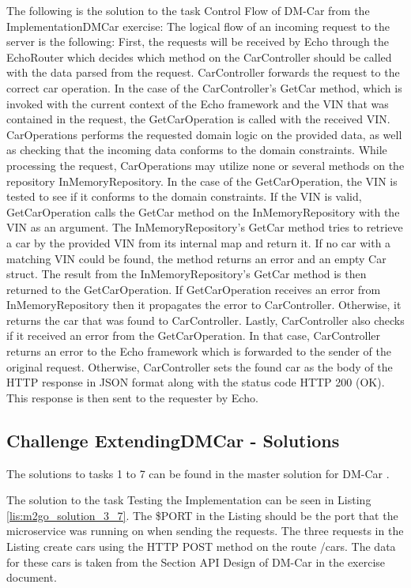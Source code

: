 The following is the solution to the task Control Flow of DM-Car from the ImplementationDMCar exercise:
The logical flow of an incoming request to the server is the following: First, the requests
will be received by Echo through the EchoRouter which decides which method on
the CarController should be called with the data parsed from the request.
CarController forwards the request to the correct car operation.
In the case of the CarController's GetCar method, which is invoked with the current
context of the Echo framework and the VIN that was contained in the request,
the GetCarOperation is called with the received VIN. CarOperations performs the requested domain logic
on the provided data, as well as checking that the incoming data conforms to the
domain constraints. While processing the request, CarOperations may utilize
none or several methods on the repository InMemoryRepository.
In the case of the GetCarOperation, the VIN is tested to see if it conforms
to the domain constraints. If the VIN is valid, GetCarOperation calls the GetCar method
on the InMemoryRepository with the VIN as an argument.
The InMemoryRepository's GetCar method tries to retrieve a car by the provided VIN from its internal map
and return it.
If no car with a matching VIN could be found, the method returns an error and an empty Car struct.
The result from the InMemoryRepository's GetCar method is then returned to the GetCarOperation.
If GetCarOperation receives an error from InMemoryRepository then it propagates the error
to CarController. Otherwise, it returns the car that was found to CarController.
Lastly, CarController also checks if it received an error from the GetCarOperation.
In that case, CarController returns an error to the Echo framework which is forwarded to the sender of the original request.
Otherwise, CarController sets the found car as the body of the HTTP response in JSON format along
with the status code HTTP 200 (OK). This response is then sent to the requester by Echo.

\subsection*{Challenge ExtendingDMCar - Solutions}

The solutions to tasks 1 to 7 can be found in the master solution for DM-Car \cite{CM-G-DMC}.

The solution to the task Testing the Implementation can be seen in Listing \ref{lis:m2go_solution_3_7}.
The \$PORT in the Listing should be the port that the microservice was running on
when sending the requests.
The three requests in the Listing create cars using the HTTP POST method on the route /cars.
The data for these cars is taken from the Section API Design of DM-Car in the exercise document.

